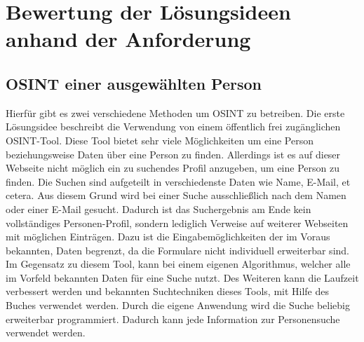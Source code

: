 

\chapter{Bewertung der Lösungsideen anhand der Anforderung}  %
\label{cha:BewertungLösungsideenAnhandAnforderung} %

\section{OSINT einer ausgewählten Person}
Hierfür gibt es zwei verschiedene Methoden um OSINT zu betreiben. Die erste Lösungsidee beschreibt die Verwendung von einem öffentlich frei zugänglichen OSINT-Tool. Diese Tool bietet sehr viele Möglichkeiten um eine Person beziehungsweise Daten über eine Person zu finden. Allerdings ist es auf dieser Webseite nicht möglich ein zu suchendes Profil anzugeben, um eine Person zu finden. Die Suchen sind aufgeteilt in verschiedenste Daten wie Name, E-Mail, et cetera. Aus diesem Grund wird bei einer Suche ausschließlich nach dem Namen oder einer E-Mail gesucht. Dadurch ist das Suchergebnis am Ende kein vollständiges Personen-Profil, sondern lediglich Verweise auf weiterer Webseiten mit möglichen Einträgen. Dazu ist die Eingabemöglichkeiten der im Voraus bekannten, Daten begrenzt, da die Formulare nicht individuell erweiterbar sind.
Im Gegensatz zu diesem Tool, kann bei einem eigenen Algorithmus, welcher alle im Vorfeld bekannten Daten für eine Suche nutzt. Des Weiteren kann die Laufzeit verbessert werden und bekannten Suchtechniken dieses Tools, mit Hilfe des Buches \cite{Bazzell} verwendet werden. Durch die eigene Anwendung wird die Suche beliebig erweiterbar programmiert. Dadurch kann jede Information zur Personensuche verwendet werden.

